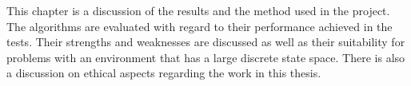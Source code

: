 This chapter is a discussion of the results and the method used in the project. The algorithms are evaluated with regard to their performance achieved in the tests. Their strengths and weaknesses are discussed as well as their suitability for problems with an environment that has a large discrete state space. There is also a discussion on ethical aspects regarding the work in this thesis.